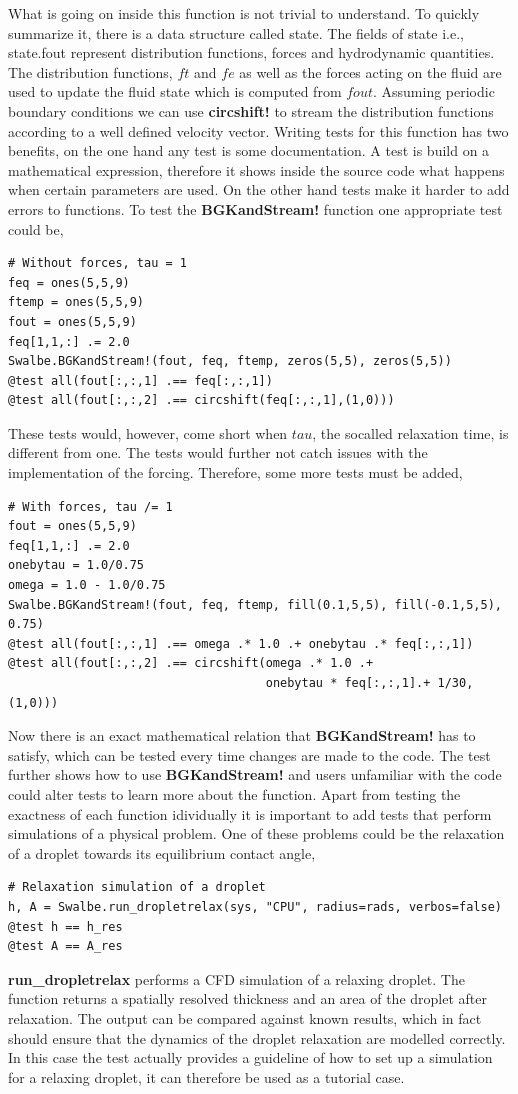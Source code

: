 What is going on inside this function is not trivial to understand.
To quickly summarize it, there is a data structure called state. 
The fields of state i.e., state.fout represent distribution functions, forces and hydrodynamic quantities.
The distribution functions, $ft$ and $fe$ as well as the forces acting on the fluid are used to update the fluid state which is computed from $fout$.
Assuming periodic boundary conditions we can use \textbf{circshift!} to stream the distribution functions according to a well defined velocity vector.
Writing tests for this function has two benefits, on the one hand any test is some documentation.
A test is build on a mathematical expression, therefore it shows inside the source code what happens when certain parameters are used.
On the other hand tests make it harder to add errors to functions.
To test the \textbf{BGKandStream!} function one appropriate test could be,
\begin{verbatim}
# Without forces, tau = 1  
feq = ones(5,5,9)
ftemp = ones(5,5,9)
fout = ones(5,5,9)
feq[1,1,:] .= 2.0
Swalbe.BGKandStream!(fout, feq, ftemp, zeros(5,5), zeros(5,5))
@test all(fout[:,:,1] .== feq[:,:,1])
@test all(fout[:,:,2] .== circshift(feq[:,:,1],(1,0)))
\end{verbatim}
These tests would, however, come short when $tau$, the socalled relaxation time, is different from one.
The tests would further not catch issues with the implementation of the forcing.
Therefore, some more tests must be added,
\begin{verbatim}
# With forces, tau /= 1
fout = ones(5,5,9)
feq[1,1,:] .= 2.0
onebytau = 1.0/0.75
omega = 1.0 - 1.0/0.75
Swalbe.BGKandStream!(fout, feq, ftemp, fill(0.1,5,5), fill(-0.1,5,5), 0.75)
@test all(fout[:,:,1] .== omega .* 1.0 .+ onebytau .* feq[:,:,1])
@test all(fout[:,:,2] .== circshift(omega .* 1.0 .+ 
                                    onebytau * feq[:,:,1].+ 1/30,(1,0)))
\end{verbatim}
Now there is an exact mathematical relation that \textbf{BGKandStream!} has to satisfy, which can be tested every time changes are made to the code.
The test further shows how to use \textbf{BGKandStream!} and users unfamiliar with the code could alter tests to learn more about the function.
Apart from testing the exactness of each function idividually it is important to add tests that perform simulations of a physical problem.
One of these problems could be the relaxation of a droplet towards its equilibrium contact angle,
\begin{verbatim}
# Relaxation simulation of a droplet
h, A = Swalbe.run_dropletrelax(sys, "CPU", radius=rads, verbos=false)
@test h == h_res
@test A == A_res
\end{verbatim}
\textbf{run\_dropletrelax} performs a CFD simulation of a relaxing droplet.
The function returns a spatially resolved thickness and an area of the droplet after relaxation.
The output can be compared against known results, which in fact should ensure that the dynamics of the droplet relaxation are modelled correctly. 
In this case the test actually provides a guideline of how to set up a simulation for a relaxing droplet, it can therefore be used as a tutorial case.

